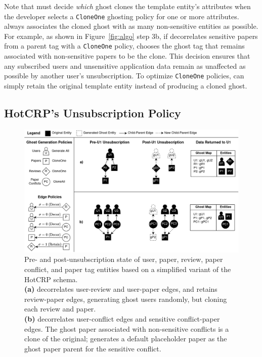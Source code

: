 Note that \sys must decide \emph{which} ghost clones the template entity's attributes when the
developer selects a \texttt{CloneOne} ghosting policy for one or more attributes. \sys always
associates the cloned ghost with as many non-sensitive entities as possible. For example, as shown
in Figure~\ref{fig:algo} step 3b, if \sys decorrelates sensitive papers from a parent tag with a
\texttt{CloneOne} policy, \sys chooses the ghost tag that remains associated with non-sensitive
papers to be the clone. This decision ensures that any subscribed users and unsensitive application
data remain as unaffected as possible by another user's unsubscription. To optimize
\texttt{CloneOne} policies, \sys can simply retain the original template entity instead of producing
a cloned ghost.

\subsection{HotCRP's Unsubscription Policy}
\label{sec:hotcrp_example}
\begin{figure}[t!]
    \centering
    \includegraphics[width=\textwidth]{img/decor_hotcrp}

    \caption{Pre- and post-unsubscription state of user, paper, review, paper conflict, and paper
    tag entities based on a simplified variant of the HotCRP schema. \\ 
    \textbf{(a)} \sys decorrelates user-review and user-paper edges, and retains
    review-paper edges, generating ghost users randomly, but cloning each review and paper. \\
    \textbf{(b)} \sys decorrelates user-conflict edges and sensitive conflict-paper edges. The ghost
    paper associated with non-sensitive conflicts is a clone of the original; \sys generates a
    default placeholder paper as the ghost paper parent for the sensitive conflict.
    }
    \label{fig:hotcrp}
\end{figure}

